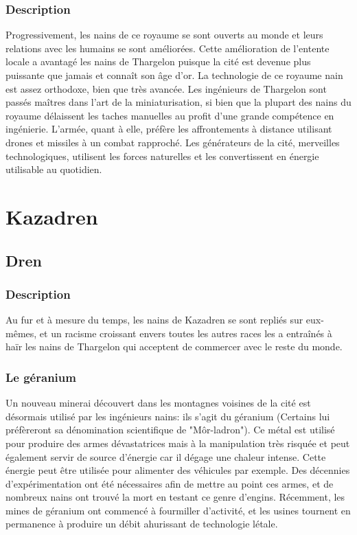 \subsubsection{Description}
Progressivement, les nains de ce royaume se sont ouverts au monde et leurs relations avec les humains se sont améliorées. Cette amélioration de l'entente locale a avantagé les nains de Thargelon puisque la cité est devenue plus puissante que jamais et connaît son âge d'or.
\newline
La technologie de ce royaume nain est assez orthodoxe, bien que très avancée. Les ingénieurs de Thargelon sont passés maîtres dans l'art de la miniaturisation, si bien que la plupart des nains du royaume délaissent les taches manuelles au profit d'une grande compétence en ingénierie. L'armée, quant à elle, préfère les affrontements à distance utilisant drones et missiles à un combat rapproché. Les générateurs de la cité, merveilles technologiques, utilisent les forces naturelles et les convertissent en énergie utilisable au quotidien.
\section{Kazadren}
\subsection{Dren}
\subsubsection{Description}
Au fur et à mesure du temps, les nains de Kazadren se sont repliés sur eux-mêmes, et un racisme croissant envers toutes les autres races les a entraînés à haïr les nains de Thargelon qui acceptent de commercer avec le reste du monde.
\subsubsection{Le géranium}
Un nouveau minerai découvert dans les montagnes voisines de la cité est désormais utilisé par les ingénieurs nains: ils s'agit du géranium (Certains lui préfèreront sa dénomination scientifique de "Môr-ladron"). Ce métal est utilisé pour produire des armes dévastatrices mais à la manipulation très risquée et peut également servir de source d'énergie car il dégage une chaleur intense. Cette énergie peut être utilisée pour alimenter des véhicules par exemple. Des décennies d'expérimentation ont été nécessaires afin de mettre au point ces armes, et de nombreux nains ont trouvé la mort en testant ce genre d'engins. Récemment, les mines de géranium ont commencé à fourmiller d'activité, et les usines tournent en permanence à produire un débit ahurissant de technologie létale.
